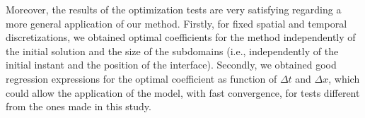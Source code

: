 \indent Moreover, the results of the optimization tests are very satisfying regarding a more general application of our method. Firstly, for fixed spatial and temporal discretizations, we obtained optimal coefficients for the method independently of the initial solution and the size of the subdomains (i.e., independently of the initial instant and the position of the interface). Secondly, we obtained good regression expressions for the optimal coefficient as function of $\Delta t$ and $\Delta x$, which could allow the application of the model, with fast convergence, for tests different from the ones made in this study.













